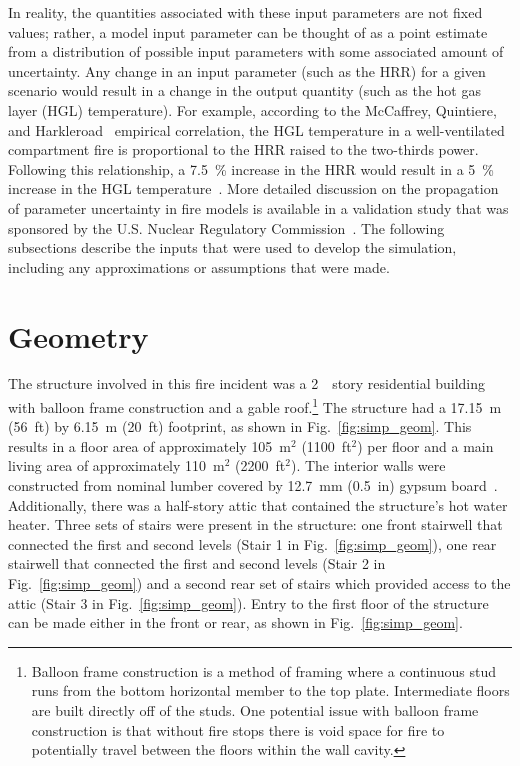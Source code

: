 \documentclass[12pt,oneside]{book}
\begin{document}
In reality, the quantities associated with these input parameters are not fixed values; rather, a model input parameter can be thought of as a point estimate from a distribution of possible input parameters with some associated amount of uncertainty. Any change in an input parameter (such as the HRR) for a given scenario would result in a change in the output quantity (such as the hot gas layer (HGL) temperature). For example, according to the McCaffrey, Quintiere, and Harkleroad~\cite{SFPE:Walton} empirical correlation, the HGL temperature in a well-ventilated compartment fire is proportional to the HRR raised to the two-thirds power. Following this relationship, a 7.5~\% increase in the HRR would result in a 5~\% increase in the HGL temperature~\cite{NUREG_1824_Sup_1}. More detailed discussion on the propagation of parameter uncertainty in fire models is available in a validation study that was sponsored by the U.S. Nuclear Regulatory Commission~\cite{NUREG_1824_Sup_1}. The following subsections describe the inputs that were used to develop the simulation, including any approximations or assumptions that were made.

\section{Geometry}
\label{geom}
The structure involved in this fire incident was a 2~~story residential building with balloon frame construction and a gable roof.\footnote{Balloon frame construction is a method of framing where a continuous stud runs from the bottom horizontal member to the top plate. Intermediate floors are built directly off of the studs. One potential issue with balloon frame construction is that without fire stops there is void space for fire to potentially travel between the floors within the wall cavity.} The structure had a 17.15~m (56~ft) by 6.15~m (20~ft) footprint, as shown in Fig.~\ref{fig:simp_geom}. This results in a floor area of approximately 105~m$^2$ (1100~ft$^2$) per floor and a main living area of approximately 110~m$^2$ (2200~ft$^2$). The interior walls were constructed from nominal lumber covered by 12.7~mm (0.5~in) gypsum board~\cite{NIOSH:Bowyer}. Additionally, there was a half-story attic that contained the structure's hot water heater. Three sets of stairs were present in the structure: one front stairwell that connected the first and second levels (Stair 1 in Fig.~\ref{fig:simp_geom}), one rear stairwell that connected the first and second levels (Stair 2 in Fig.~\ref{fig:simp_geom}) and a second rear set of stairs which provided access to the attic (Stair 3 in Fig.~\ref{fig:simp_geom}). Entry to the first floor of the structure can be made either in the front or rear, as shown in Fig.~\ref{fig:simp_geom}.
\end{document}
